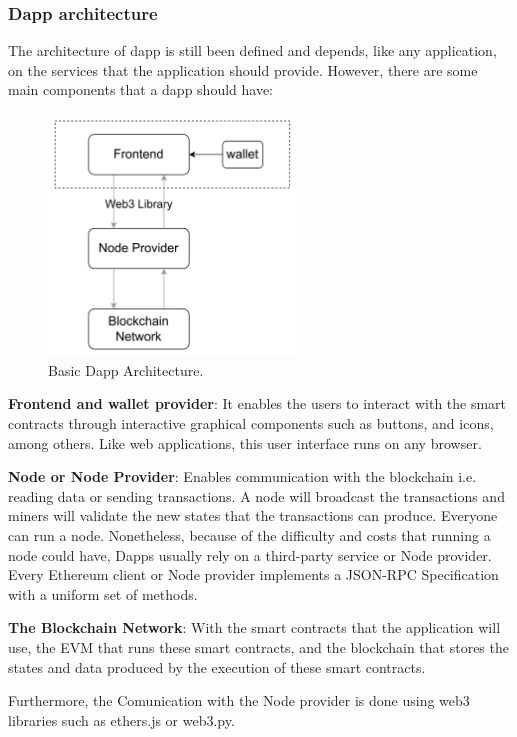 \documentclass[11pt,a4paper]{report}
\begin{document}
\subsubsection{Dapp architecture}
The architecture of dapp is still been defined and depends, like any application, on the services that the application should provide. However, there are some main components that a dapp should have: 
\begin{figure}[htp]
	\centering
	\includegraphics[width=0.6\textwidth]{./images/dapp_components}
	\caption{Basic Dapp Architecture.}
	\label{fig:dapp_components}
\end{figure}
\begin{description}		
	\item \textbf{Frontend and wallet provider}: It enables the users to interact with the smart contracts through interactive graphical components such as buttons, and icons, among others. Like web applications, this user interface runs on any browser.
	\item \textbf{Node or Node Provider}: Enables communication with the blockchain i.e. reading data or sending transactions. A node will broadcast the transactions and miners will validate the new states that the transactions can produce. Everyone can run a node. Nonetheless, because of the difficulty and costs that running a node could have, Dapps usually rely on a third-party service or Node provider. Every Ethereum client or Node provider implements a JSON-RPC\cite{json_rpc} Specification with a uniform set of methods.
	\item \textbf{The Blockchain Network}: With the smart contracts that the application will use, the EVM that runs these smart contracts, and the blockchain that stores the states and data produced by the execution of these smart contracts.
\end{description}
Furthermore, the Comunication with the Node provider is done using web3 libraries such as ethers.js\cite{ethersjs} or web3.py\cite{web3py}.
\end{document}
